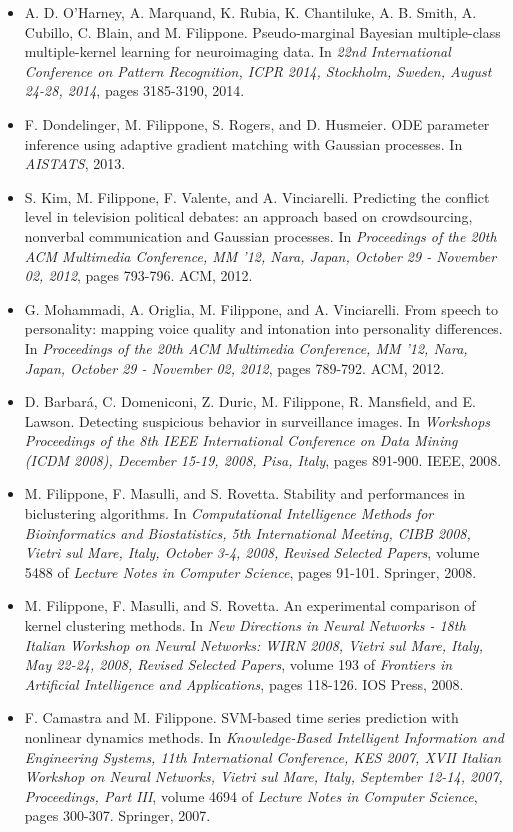 \begin{itemize}
\item  A. D. O'Harney, A. Marquand, K. Rubia, K. Chantiluke, A. B. Smith, A. Cubillo, C. Blain, and M. Filippone. Pseudo-marginal Bayesian multiple-class multiple-kernel learning for neuroimaging data. In \emph{22nd International Conference on Pattern Recognition, ICPR 2014, Stockholm, Sweden, August 24-28, 2014}, pages 3185-3190, 2014.  
\item  F. Dondelinger, M. Filippone, S. Rogers, and D. Husmeier. ODE parameter inference using adaptive gradient matching with Gaussian processes. In \emph{AISTATS}, 2013. 
\item  S. Kim, M. Filippone, F. Valente, and A. Vinciarelli. Predicting the conflict level in television political debates: an approach based on crowdsourcing, nonverbal communication and Gaussian processes. In \emph{Proceedings of the 20th ACM Multimedia Conference, MM '12, Nara, Japan, October 29 - November 02, 2012}, pages 793-796. ACM, 2012.  
\item  G. Mohammadi, A. Origlia, M. Filippone, and A. Vinciarelli. From speech to personality: mapping voice quality and intonation into personality differences. In \emph{Proceedings of the 20th ACM Multimedia Conference, MM '12, Nara, Japan, October 29 - November 02, 2012}, pages 789-792. ACM, 2012.  
\item  D. Barbar\'a, C. Domeniconi, Z. Duric, M. Filippone, R. Mansfield, and E. Lawson. Detecting suspicious behavior in surveillance images. In \emph{Workshops Proceedings of the 8th IEEE International Conference on Data Mining (ICDM 2008), December 15-19, 2008, Pisa, Italy}, pages 891-900. IEEE, 2008.  
\item  M. Filippone, F. Masulli, and S. Rovetta. Stability and performances in biclustering algorithms. In \emph{Computational Intelligence Methods for Bioinformatics and Biostatistics, 5th International Meeting, CIBB 2008, Vietri sul Mare, Italy, October 3-4, 2008, Revised Selected Papers}, volume 5488 of \emph{Lecture Notes in Computer Science}, pages 91-101. Springer, 2008.  
\item  M. Filippone, F. Masulli, and S. Rovetta. An experimental comparison of kernel clustering methods. In \emph{New Directions in Neural Networks - 18th Italian Workshop on Neural Networks: WIRN 2008, Vietri sul Mare, Italy, May 22-24, 2008, Revised Selected Papers}, volume 193 of \emph{Frontiers in Artificial Intelligence and Applications}, pages 118-126. IOS Press, 2008.  
\item  F. Camastra and M. Filippone. SVM-based time series prediction with nonlinear dynamics methods. In \emph{Knowledge-Based Intelligent Information and Engineering Systems, 11th International Conference, KES 2007, XVII Italian Workshop on Neural Networks, Vietri sul Mare, Italy, September 12-14, 2007, Proceedings, Part III}, volume 4694 of \emph{Lecture Notes in Computer Science}, pages 300-307. Springer, 2007.  

\end{itemize}

